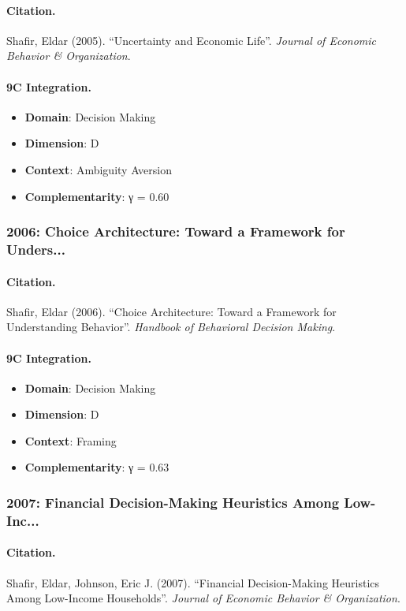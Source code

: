 \paragraph{Citation.}
Shafir, Eldar (2005). ``Uncertainty and Economic Life''. \textit{Journal of Economic Behavior & Organization}.

\paragraph{9C Integration.}
\begin{itemize}[nosep]
  \item \textbf{Domain}: Decision Making
  \item \textbf{Dimension}: D
  \item \textbf{Context}: Ambiguity Aversion
  \item \textbf{Complementarity}: γ = 0.60
\end{itemize}


\subsubsection{2006: Choice Architecture: Toward a Framework for Unders...}

\paragraph{Citation.}
Shafir, Eldar (2006). ``Choice Architecture: Toward a Framework for Understanding Behavior''. \textit{Handbook of Behavioral Decision Making}.

\paragraph{9C Integration.}
\begin{itemize}[nosep]
  \item \textbf{Domain}: Decision Making
  \item \textbf{Dimension}: D
  \item \textbf{Context}: Framing
  \item \textbf{Complementarity}: γ = 0.63
\end{itemize}


\subsubsection{2007: Financial Decision-Making Heuristics Among Low-Inc...}

\paragraph{Citation.}
Shafir, Eldar, Johnson, Eric J. (2007). ``Financial Decision-Making Heuristics Among Low-Income Households''. \textit{Journal of Economic Behavior & Organization}.

